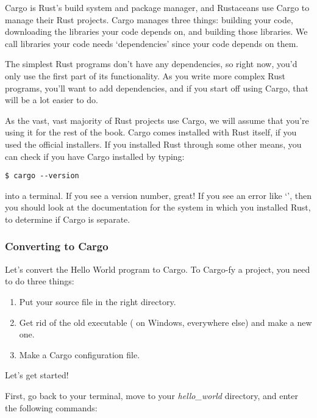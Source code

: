 Cargo is Rust’s build system and package manager, and Rustaceans use Cargo to manage their Rust projects. Cargo manages 
three things: building your code, downloading the libraries your code depends on, and building those libraries. We call 
libraries your code needs ‘dependencies’ since your code depends on them.

\blank

The simplest Rust programs don’t have any dependencies, so right now, you'd only use the first part of its functionality. 
As you write more complex Rust programs, you’ll want to add dependencies, and if you start off using Cargo, that will be 
a lot easier to do.

\blank

As the vast, vast majority of Rust projects use Cargo, we will assume that you’re using it for the rest of the book. 
Cargo comes installed with Rust itself, if you used the official installers. If you installed Rust through some other 
means, you can check if you have Cargo installed by typing:

\begin{verbatim}
$ cargo --version
\end{verbatim}

into a terminal. If you see a version number, great! If you see an error like ‘’, then you should look 
at the documentation for the system in which you installed Rust, to determine if Cargo is separate.

\subsubsection*{Converting to Cargo}

Let’s convert the Hello World program to Cargo. To Cargo-fy a project, you need to do three things:

\begin{enumerate}
    \item{Put your source file in the right directory.}
    \item{Get rid of the old executable ( on Windows,  everywhere else) and make a new one.}
    \item{Make a Cargo configuration file.}
\end{enumerate}

Let's get started!


First, go back to your terminal, move to your \emph{hello\_world} directory, and enter the following commands:


